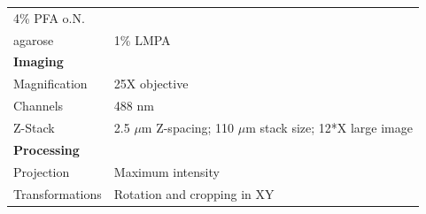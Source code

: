 \documentclass[11pt,singlespacinge,twoside]{reedthesis} %
\begin{document}
\begin{longtable}[]{@{}ll@{}}
\begin{minipage}[t]{0.73\columnwidth}
4\% PFA o.N.\strut
\end{minipage}\tabularnewline
\begin{minipage}[t]{0.21\columnwidth}\raggedright
agarose\strut
\end{minipage} & \begin{minipage}[t]{0.73\columnwidth}\raggedright
1\% LMPA\strut
\end{minipage}\tabularnewline
\begin{minipage}[t]{0.21\columnwidth}\raggedright
\textbf{Imaging}\strut
\end{minipage} & \begin{minipage}[t]{0.73\columnwidth}\raggedright
\strut
\end{minipage}\tabularnewline
\begin{minipage}[t]{0.21\columnwidth}\raggedright
Magnification\strut
\end{minipage} & \begin{minipage}[t]{0.73\columnwidth}\raggedright
25X objective\strut
\end{minipage}\tabularnewline
\begin{minipage}[t]{0.21\columnwidth}\raggedright
Channels\strut
\end{minipage} & \begin{minipage}[t]{0.73\columnwidth}\raggedright
488 nm\strut
\end{minipage}\tabularnewline
\begin{minipage}[t]{0.21\columnwidth}\raggedright
Z-Stack\strut
\end{minipage} & \begin{minipage}[t]{0.73\columnwidth}\raggedright
2.5 \(\mu\)m Z-spacing; 110 \(\mu\)m stack size; 12*X large image\strut
\end{minipage}\tabularnewline
\begin{minipage}[t]{0.21\columnwidth}\raggedright
\textbf{Processing}\strut
\end{minipage} & \begin{minipage}[t]{0.73\columnwidth}\raggedright
\strut
\end{minipage}\tabularnewline
\begin{minipage}[t]{0.21\columnwidth}\raggedright
Projection\strut
\end{minipage} & \begin{minipage}[t]{0.73\columnwidth}\raggedright
Maximum intensity\strut
\end{minipage}\tabularnewline
\begin{minipage}[t]{0.21\columnwidth}\raggedright
Transformations\strut
\end{minipage} & \begin{minipage}[t]{0.73\columnwidth}\raggedright
Rotation and cropping in XY\strut
\end{minipage}\tabularnewline
\bottomrule
\end{longtable}
\end{document}
